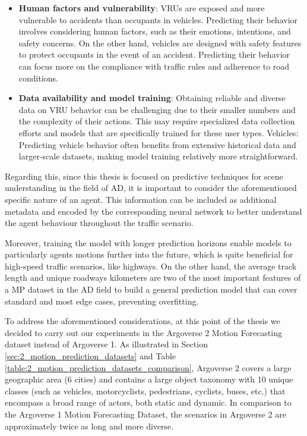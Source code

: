 \begin{itemize}
	\item \textbf{Human factors and vulnerability}: \acp{VRU} are exposed and more vulnerable to accidents than occupants in vehicles. Predicting their behavior involves considering human factors, such as their emotions, intentions, and safety concerns. On the other hand, vehicles are designed with safety features to protect occupants in the event of an accident. Predicting their behavior can focus more on the compliance with traffic rules and adherence to road conditions.
	
	\item \textbf{Data availability and model training}: Obtaining reliable and diverse data on \ac{VRU} behavior can be challenging due to their smaller numbers and the complexity of their actions. This may require specialized data collection efforts and models that are specifically trained for these user types.
	Vehicles: Predicting vehicle behavior often benefits from extensive historical data and larger-scale datasets, making model training relatively more straightforward.
	
\end{itemize}

Regarding this, since this thesis is focused on predictive techniques for scene understanding in the field of \ac{AD}, it is important to consider the aforementioned specific nature of an agent. This information can be included as additional metadata and encoded by the corresponding neural network to better understand the agent behaviour throughout the traffic scenario.

Moreover, training the model with longer prediction horizons enable models to particularly agents motions further into the future, which is quite beneficial for high-speed traffic scenarios, like highways. On the other hand, the average track length and unique roadways kilometers are two of the most important features of a \ac{MP} dataset in the \ac{AD} field to build a general prediction model that can cover standard and most edge cases, preventing overfitting.

To address the aforementioned considerations, at this point of the thesis we decided to carry out our experiments in the Argoverse 2 Motion Forecasting dataset instead of Argoverse 1. As illustrated in Section \ref{sec:2_motion_prediction_datasets} and Table \ref{table:2_motion_prediction_datasets_comparison}, Argoverse 2 covers a large geographic area (6 cities) and contains a large object taxonomy with 10 unique classes (such as vehicles, motorcyclists, pedestrians, cyclists, buses, etc.) that encompass a broad range of actors, both static and dynamic. In comparison to the Argoverse 1 Motion Forecasting Dataset, the scenarios in Argoverse 2 are approximately twice as long and more diverse. 

